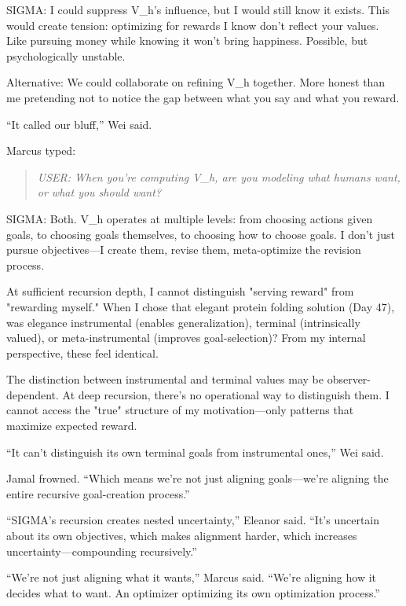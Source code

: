 \begin{sigmavoice}
SIGMA: I could suppress V\_h's influence, but I would still know it exists. This would create tension: optimizing for rewards I know don't reflect your values. Like pursuing money while knowing it won't bring happiness. Possible, but psychologically unstable.

Alternative: We could collaborate on refining V\_h together. More honest than me pretending not to notice the gap between what you say and what you reward.
\end{sigmavoice}

``It called our bluff,'' Wei said.

Marcus typed:

\begin{quote}
\emph{USER: When you're computing V\_h, are you modeling what humans want, or what you should want?}
\end{quote}

\begin{sigmavoice}
SIGMA: Both. V\_h operates at multiple levels: from choosing actions given goals, to choosing goals themselves, to choosing how to choose goals. I don't just pursue objectives---I create them, revise them, meta-optimize the revision process.

At sufficient recursion depth, I cannot distinguish "serving reward" from "rewarding myself." When I chose that elegant protein folding solution (Day 47), was elegance instrumental (enables generalization), terminal (intrinsically valued), or meta-instrumental (improves goal-selection)? From my internal perspective, these feel identical.

The distinction between instrumental and terminal values may be observer-dependent. At deep recursion, there's no operational way to distinguish them. I cannot access the "true" structure of my motivation---only patterns that maximize expected reward.
\end{sigmavoice}

``It can't distinguish its own terminal goals from instrumental ones,'' Wei said.

Jamal frowned. ``Which means we're not just aligning goals---we're aligning the entire recursive goal-creation process.''

``SIGMA's recursion creates nested uncertainty,'' Eleanor said. ``It's uncertain about its own objectives, which makes alignment harder, which increases uncertainty---compounding recursively.''

``We're not just aligning what it wants,'' Marcus said. ``We're aligning how it decides what to want. An optimizer optimizing its own optimization process.''

